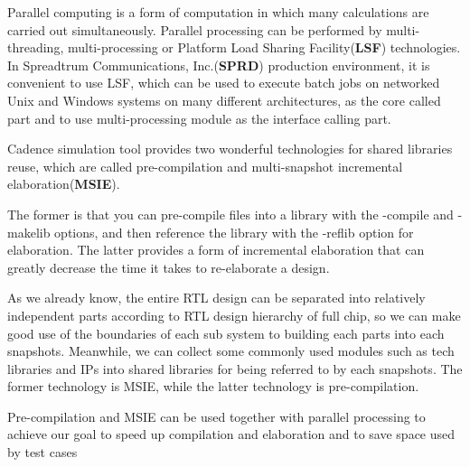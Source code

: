\documentclass[twoside]{article}
\begin{document}
\begin{multicols}{2}
  Parallel computing is a form of computation in which many calculations are carried out simultaneously.\cite{parallel} Parallel processing can be performed by multi-threading, multi-processing or Platform Load Sharing Facility(\textbf{LSF}) technologies. In Spreadtrum Communications, Inc.(\textbf{SPRD}) production environment, it is convenient to use LSF, which can be used to execute batch jobs on networked Unix and Windows systems on many different architectures,\cite{LSF1}\cite{LSF2} as the core called part and to use multi-processing module as the interface calling part.

  Cadence simulation tool provides two wonderful technologies for shared libraries reuse, which are called pre-compilation and multi-snapshot incremental elaboration(\textbf{MSIE}).

  The former is that you can pre-compile files into a library with the -compile and -makelib options, and then reference the library with the -reflib option for elaboration. The latter provides a form of incremental elaboration that can greatly decrease the time it takes to re-elaborate a design.

  As we already know, the entire RTL design can be separated into relatively independent parts according to RTL design hierarchy of full chip, so we can make good use of the boundaries of each sub system to building each parts into each snapshots. Meanwhile, we can collect some commonly used modules such as tech libraries and IPs into shared libraries for being referred to by each snapshots. The former technology is MSIE, while the latter technology is pre-compilation.

  Pre-compilation and MSIE can be used together with parallel processing to achieve our goal to speed up compilation and elaboration and to save space used by test cases


\end{multicols}
\end{document}
